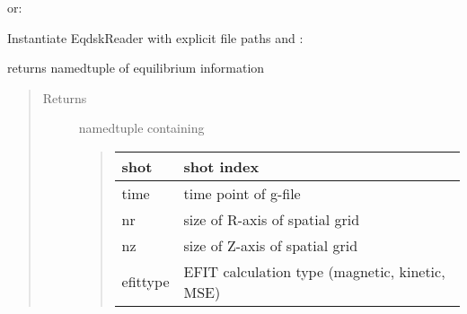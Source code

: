 \documentclass[letterpaper,10pt,english]{sphinxmanual}
\begin{document}
\begin{fulllineitems}
or:

\begin{sphinxVerbatim}[commandchars=\\\{\}]
  
\end{sphinxVerbatim}

Instantiate EqdskReader with explicit file paths  and
:

\begin{sphinxVerbatim}[commandchars=\\\{\}]
  
\end{sphinxVerbatim}

\begin{fulllineitems}
\label{\detokenize{eqtools:eqtools.eqdskreader.EqdskReader.getInfo}}
returns namedtuple of equilibrium information
\begin{quote}\begin{description}
\item[{Returns}] \leavevmode

namedtuple containing
\begin{quote}


\begin{savenotes}\sphinxattablestart
\centering
\begin{tabulary}{\linewidth}[t]{|T|T|}
\hline

shot
&
shot index
\\
\hline
time
&
time point of g-file
\\
\hline
nr
&
size of R-axis of spatial grid
\\
\hline
nz
&
size of Z-axis of spatial grid
\\
\hline
efittype
&
EFIT calculation type (magnetic, kinetic, MSE)
\\
\hline
\end{tabulary}
\par
\sphinxattableend\end{savenotes}
\end{quote}



\end{description}
\end{quote}
\end{fulllineitems}
\end{fulllineitems}
\end{document}
